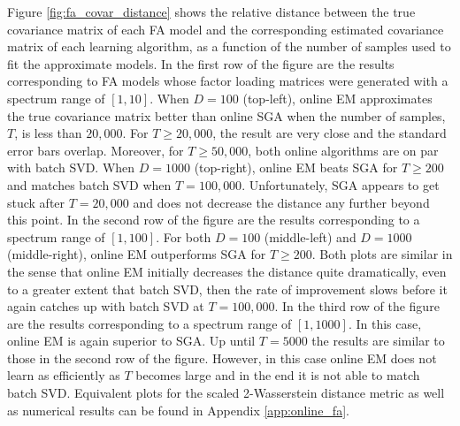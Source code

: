 \documentclass[msc,deptreport.inf]{infthesis} %
\begin{document}
Figure \ref{fig:fa_covar_distance} shows the relative distance between the true covariance matrix of each FA model and the corresponding estimated covariance matrix of each learning algorithm, as a function of the number of samples used to fit the approximate models. In the first row of the figure are the results corresponding to FA models whose factor loading matrices were generated with a spectrum range of $[1, 10]$. When $D=100$ (top-left), online EM approximates the true covariance matrix better than online SGA when the number of samples, $T$, is less than $20,000$. For $T \geq 20,000$, the result are very close and the standard error bars overlap. Moreover, for $T \geq 50,000$, both online algorithms are on par with batch SVD. When $D=1000$ (top-right), online EM beats SGA for $T \geq 200$ and matches batch SVD when $T=100,000$. Unfortunately, SGA appears to get stuck after $T=20,000$ and does not decrease the distance any further beyond this point. In the second row of the figure are the results corresponding to a spectrum range of $[1, 100]$. For both $D=100$ (middle-left) and $D=1000$ (middle-right), online EM outperforms SGA for $T \geq 200$. Both plots are similar in the sense that online EM initially decreases the distance quite dramatically, even to a greater extent that batch SVD, then the rate of improvement slows before it again catches up with batch SVD at $T=100,000$. In the third row of the figure are the results corresponding to a spectrum range of $[1, 1000]$. In this case, online EM is again superior to SGA. Up until $T=5000$ the results are similar to those in the second row of the figure. However, in this case online EM does not learn as efficiently as $T$ becomes large and in the end it is not able to match batch SVD. Equivalent plots for the scaled 2-Wasserstein distance metric as well as numerical results can be found in Appendix \ref{app:online_fa}.
\end{document}
